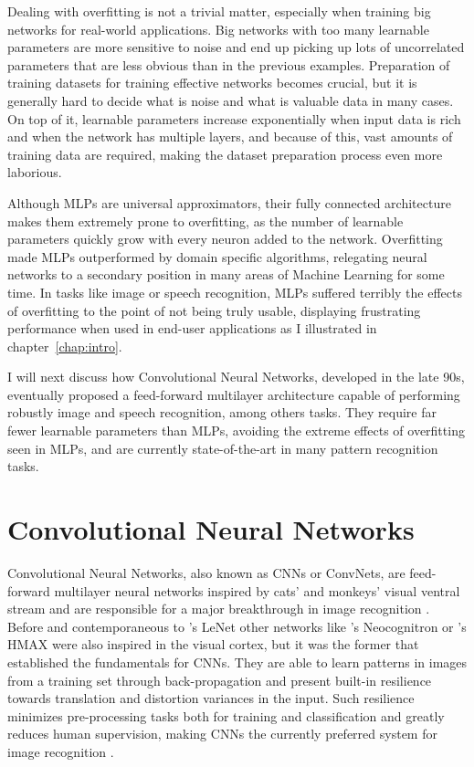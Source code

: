Dealing with overfitting is not a trivial matter, especially when training big networks for real-world applications.
Big networks with too many learnable parameters are more sensitive to noise and end up picking up lots of uncorrelated parameters that are less obvious than in the previous examples.
Preparation of training datasets for training effective networks becomes crucial, but it is generally hard to decide what is noise and what is valuable data in many cases.
On top of it, learnable parameters increase exponentially when input data is rich and when the network has multiple layers, and because of this, vast amounts of training data are required, making the dataset preparation process even more laborious.

Although MLPs are universal approximators, their fully connected architecture makes them extremely prone to overfitting, as the number of learnable parameters quickly grow with every neuron added to the network.
Overfitting made MLPs outperformed by domain specific algorithms, relegating neural networks to a secondary position in many areas of Machine Learning for some time.
In tasks like image or speech recognition, MLPs suffered terribly the effects of overfitting to the point of not being truly usable, displaying frustrating performance when used in end-user applications as I illustrated in chapter~\ref{chap:intro}.

I will next discuss how Convolutional Neural Networks, developed in the late 90s, eventually proposed a feed-forward multilayer architecture capable of performing robustly image and speech recognition, among others tasks.
They require far fewer learnable parameters than MLPs, avoiding the extreme effects of overfitting seen in MLPs, and are currently state-of-the-art in many pattern recognition tasks.



\section{Convolutional Neural Networks}
\label{sec:theory:convnets}
Convolutional Neural Networks, also known as CNNs or ConvNets, are feed-forward multilayer neural networks inspired by cats' and monkeys' visual ventral stream \cite{Hubel1968,Lawrence1997} and are responsible for a major breakthrough in image recognition \cite{LeCun1995}.
Before and contemporaneous to \citeauthor{LeCun1998}'s LeNet \cite{LeCun1998} other networks like \citeauthor{Fukushima1980}'s Neocognitron \cite{Fukushima1980} or \citeauthor{Riesenhuber1999}'s HMAX \cite{Riesenhuber1999} were also inspired in the visual cortex, but it was the former that established the fundamentals for CNNs.
They are able to learn patterns in images from a training set through back-propagation and present built-in resilience towards translation and distortion variances in the input.
Such resilience minimizes pre-processing tasks both for training and classification and greatly reduces human supervision, making CNNs the currently preferred system for image recognition \cite{Visin2015}.

